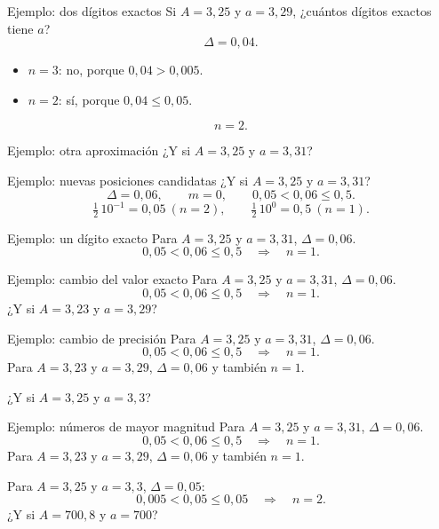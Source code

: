 \documentclass[original_version/main.tex]{subfiles}
\begin{document}
\begin{frame}{Ejemplo: dos dígitos exactos}
Si $A=3{,}25$ y $a=3{,}29$, ¿cuántos dígitos exactos tiene $a$?\[\Delta=0{,}04.\]\begin{itemize}\item $n=3$: no, porque $0{,}04>0{,}005$.\item $n=2$: sí, porque $0{,}04\le0{,}05$.\end{itemize}\[\boxed{n=2.}\]
\end{frame}

\begin{frame}{Ejemplo: otra aproximación}
¿Y si $A=3{,}25$ y $a=3{,}31$?
\end{frame}

\begin{frame}{Ejemplo: nuevas posiciones candidatas}
¿Y si $A=3{,}25$ y $a=3{,}31$?\[\Delta=0{,}06,\qquad m=0,\qquad0{,}05<0{,}06\le0{,}5.\]\[\tfrac12\,10^{-1}=0{,}05\ (n=2),\qquad\tfrac12\,10^0=0{,}5\ (n=1).\]
\end{frame}

\begin{frame}{Ejemplo: un dígito exacto}
Para $A=3{,}25$ y $a=3{,}31$, $\Delta=0{,}06$.\[0{,}05<0{,}06\le0{,}5\quad\Longrightarrow\quad\boxed{n=1}.\]
\end{frame}

\begin{frame}{Ejemplo: cambio del valor exacto}
Para $A=3{,}25$ y $a=3{,}31$, $\Delta=0{,}06$.\[0{,}05<0{,}06\le0{,}5\quad\Longrightarrow\quad\boxed{n=1}.\]\medskip ¿Y si $A=3{,}23$ y $a=3{,}29$?
\end{frame}

\begin{frame}{Ejemplo: cambio de precisión}
Para $A=3{,}25$ y $a=3{,}31$, $\Delta=0{,}06$.\[0{,}05<0{,}06\le0{,}5\quad\Longrightarrow\quad\boxed{n=1}.\]Para $A=3{,}23$ y $a=3{,}29$, $\Delta=0{,}06$ y también $n=1$.\par\medskip ¿Y si $A=3{,}25$ y $a=3{,}3$?
\end{frame}

\begin{frame}{Ejemplo: números de mayor magnitud}
\small Para $A=3{,}25$ y $a=3{,}31$, $\Delta=0{,}06$.\[0{,}05<0{,}06\le0{,}5\quad\Longrightarrow\quad\boxed{n=1}.\]Para $A=3{,}23$ y $a=3{,}29$, $\Delta=0{,}06$ y también $n=1$.\par\medskip Para $A=3{,}25$ y $a=3{,}3$, $\Delta=0{,}05$:\[0{,}005<0{,}05\le0{,}05\quad\Longrightarrow\quad n=2.\]¿Y si $A=700{,}8$ y $a=700$?
\end{frame}
\end{document}
